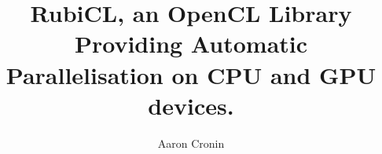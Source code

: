 \title{RubiCL, an OpenCL Library Providing Automatic Parallelisation on CPU and GPU devices.}

\author{Aaron Cronin}


